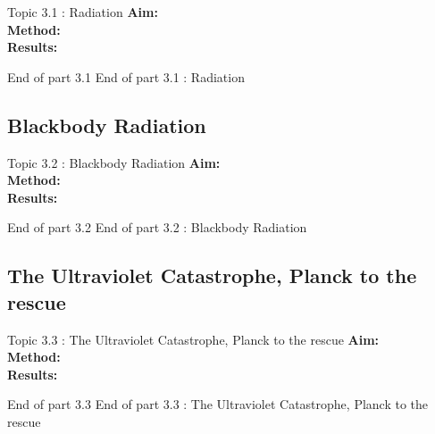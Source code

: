 \begin{frame}{Topic 3.1 : Radiation}
\small
\textbf{Aim:}\\
\textbf{Method:}\\
\textbf{Results:}\\
\end{frame}


%  
\begin{frame}{}
\small

\end{frame}

 \begin{frame}{End of part 3.1}
End of part 3.1 : Radiation\\[1ex]

\end{frame}



\subsection{Blackbody Radiation}

\begin{frame}{Topic 3.2 : Blackbody Radiation}
\small
\textbf{Aim:}\\
\textbf{Method:}\\
\textbf{Results:}\\
\end{frame}


\begin{frame}{}
\small

\end{frame}


 \begin{frame}{End of part 3.2}
End of part 3.2 : Blackbody Radiation\\[1ex]

\end{frame}



\subsection{The Ultraviolet Catastrophe, Planck to the rescue}


\begin{frame}{Topic 3.3 : The Ultraviolet Catastrophe, Planck to the rescue}
\small
\textbf{Aim:}\\
\textbf{Method:}\\
\textbf{Results:}\\
\end{frame}


\begin{frame}{}
\small

\end{frame}


 \begin{frame}{End of part 3.3}
End of part 3.3 : The Ultraviolet Catastrophe, Planck to the rescue\\[1ex]

\end{frame}



 
